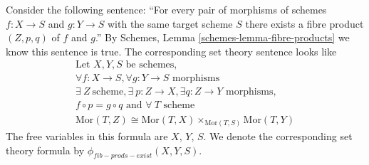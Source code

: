 \medskip\noindent
Consider the following sentence: ``For every pair of morphisms of
schemes $f : X \to S$ and $g : Y \to S$ with the same target scheme $S$
there exists a fibre product $(Z, p, q)$ of $f$ and $g$.''
By Schemes, Lemma \ref{schemes-lemma-fibre-products}
we know this sentence is true. The corresponding set theory
sentence looks like
\begin{eqnarray*}
\text{Let } X,Y,S \text{ be schemes}, \\
\forall f : X \to S, \forall g : Y \to S \text{ morphisms} \\
\exists\ Z\ \text{scheme},
\exists\ p : Z \to X, \exists q : Z \to Y \text{ morphisms}, \\
f \circ p = g \circ q\text{ and }
\forall\ T \text{ scheme} \\
\text{Mor}(T, Z) \cong \text{Mor}(T,X)
\times_{\text{Mor}(T,S)} \text{Mor}(T, Y)
\end{eqnarray*}
The free variables in this formula are $X$, $Y$, $S$.
We denote the corresponding set theory formula by
$\phi_{fib-prods-exist}(X, Y, S)$.

